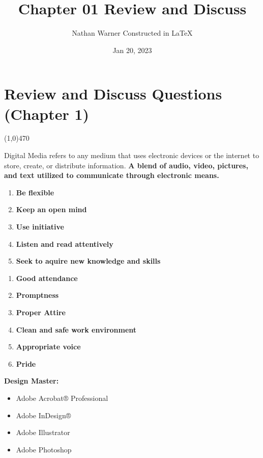 \documentclass{report}
\title{\Huge{Chapter 01 Review and Discuss}}
\author{\huge{Nathan Warner Constructed in LaTeX}}
\date{\huge{Jan 20, 2023}}
\begin{document}
    \maketitle
    \section{\Large{Review and Discuss Questions (Chapter 1)}}
    \line(1,0){470}
    \bigbreak \noindent 

        Digital Media refers to any medium that uses electronic devices 
        or the internet to store, create, or distribute information. 
        \textbf{A blend of audio, video, pictures, and text utilized to communicate through 
        electronic means.}
    \bigbreak \noindent     

    \begin{enumerate}
        \item \textbf{Be flexible} 
        \item \textbf{Keep an open mind}
        \item \textbf{Use initiative}
        \item \textbf{Listen and read attentively}
        \item \textbf{Seek to aquire new knowledge and skills}
    \end{enumerate}
    \bigbreak \noindent   

    \begin{enumerate}
        \item \textbf{Good attendance} 
        \item \textbf{Promptness} 
        \item \textbf{Proper Attire} 
        \item \textbf{Clean and safe work environment} 
        \item \textbf{Appropriate voice} 
        \item \textbf{Pride} 
    \end{enumerate}
    \bigbreak \noindent

    
    \noindent \textbf{Design Master:}
    \begin{itemize}
        \item Adobe Acrobat® Professional 
        \item Adobe InDesign®
        \item Adobe Illustrator
        \item Adobe Photoshop
    \end{itemize}
    
\end{document}
